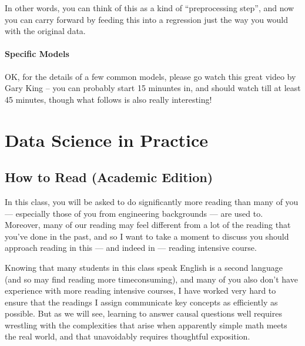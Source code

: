 \documentclass[letterpaper,10pt,english]{jupyterBook}
\begin{document}
\sphinxAtStartPar
In other words, you can think of this as a kind of “pre\sphinxhyphen{}processing step”, and now you can carry forward by feeding this into a regression just the way you would with the original data.


\subsection{Specific Models}
\label{\detokenize{35_causal/90_matching_how:specific-models}}
\sphinxAtStartPar
OK, for the details of a few common models, please go watch this great video by Gary King – you can probably start 15 minuntes in, and should watch till at least 45 minutes, though what follows is also really interesting!

\sphinxAtStartPar
{}

\sphinxstepscope


\part{Data Science in Practice}

\sphinxstepscope


\chapter{How to Read (Academic Edition)}
\label{\detokenize{40_in_practice/00_how_to_read_this_book:how-to-read-academic-edition}}\label{\detokenize{40_in_practice/00_how_to_read_this_book::doc}}
\sphinxAtStartPar
In this class, you will be asked to do significantly more reading than many of you — especially those of you from engineering backgrounds — are used to. Moreover, many of our reading may feel different from a lot of the reading that you’ve done in the past, and so I want to take a moment to discuss  you should approach reading in this — and indeed in  — reading intensive course.

\sphinxAtStartPar
Knowing that many students in this class speak English is a second language (and so may find reading more time\sphinxhyphen{}consuming), and many of you also don’t have experience with more reading intensive courses, I have worked very hard to ensure that the readings I assign communicate key concepts as efficiently as possible. But as we will see, learning to answer causal questions well requires wrestling with the complexities that arise when apparently simple math meets the real world, and that unavoidably requires thoughtful exposition.
\end{document}
